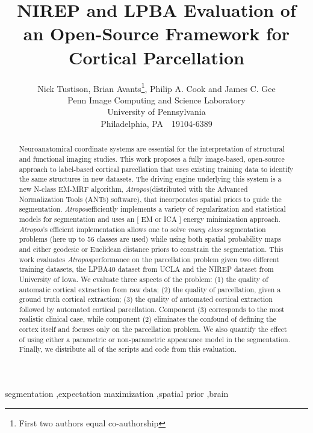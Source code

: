 \documentclass[preprint,authoryear,12pt]{elsarticle}
\newcommand {\alg}{{\em Atropos}}
\begin{document}
\date{}
\begin{frontmatter}
\title{NIREP and LPBA Evaluation of an Open-Source Framework for Cortical Parcellation}
\author{Nick Tustison, Brian Avants\footnote{First two authors equal co-authorship}, Philip A. Cook and James C. Gee\\  
  Penn Image Computing and Science Laboratory 
	\\ University of Pennsylvania \\ Philadelphia, PA~~19104-6389
	}

\begin{abstract} 
Neuroanatomical coordinate systems are essential for the
interpretation of structural and functional imaging studies.  This
work proposes a fully image-based, open-source approach to label-based
cortical parcellation that uses existing training data to identify the
same structures in new datasets.  The driving engine underlying this
system is a new N-class EM-MRF algorithm, \alg (distributed with the
Advanced Normalization Tools (ANTs) software), that incorporates
spatial priors to guide the segmentation.  \alg efficiently implements
a variety of regularization and statistical models for segmentation
and uses an [ EM or ICA ] energy minimization approach.  \alg's
efficient implementation allows one to solve {\em many class}
segmentation problems (here up to 56 classes are used) while using
both spatial probability maps and either geodesic or Euclidean
distance priors to constrain the segmentation.  This work evaluates
\alg performance on the parcellation problem given two different
training datasets, the LPBA40 dataset from UCLA and the NIREP dataset
from University of Iowa.  We evaluate three aspects of the problem: (1) the quality
of automatic cortical extraction from raw data; (2) the quality of
parcellation, given a ground truth cortical extraction; (3) the
quality of automated cortical extraction followed by automated
cortical parcellation.  Component (3) corresponds to the most
realistic clinical case, while component (2) eliminates the confound
of defining the cortex itself and focuses only on the parcellation
problem.  We also quantify the effect of using either a parametric or
non-parametric appearance model in the segmentation.  Finally, we
distribute all of the scripts and code from this evaluation.
\end{abstract}
\begin{keyword}
segmentation \sep expectation maximization \sep spatial prior \sep brain 
\end{keyword}
\end{frontmatter}
\end{document}
